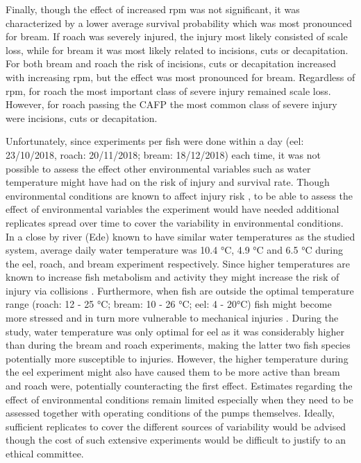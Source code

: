 \documentclass[fleqn,10pt]{wlscirep}
\begin{document}
Finally, though the effect of increased rpm was not significant, it was characterized by a lower average survival probability which was most pronounced for bream. If roach was severely injured, the injury most likely consisted of scale loss, while for bream it was most likely related to incisions, cuts or decapitation. For both bream and roach the risk of incisions, cuts or decapitation increased with increasing rpm, but the effect was most pronounced for bream. Regardless of rpm, for roach the most important class of severe injury remained scale loss. However, for roach passing the CAFP the most common class of severe injury were incisions, cuts or decapitation. 

Unfortunately, since experiments per fish were done within a day (eel: 23/10/2018, roach: 20/11/2018; bream: 18/12/2018) each time, it was not possible to assess the effect other environmental variables such as water temperature might have had on the risk of injury and survival rate. Though environmental conditions are known to affect injury risk \cite{Noble2012InjuriesWelfare,Yang2022EffectsPump}, to be able to assess the effect of environmental variables the experiment would have needed additional replicates spread over time to cover the variability in environmental conditions. In a close by river (Ede) known to have similar water temperatures as the studied system, average daily water temperature was 10.4 °C, 4.9 °C and 6.5 °C during the eel, roach, and bream experiment respectively. Since higher temperatures are known to increase fish metabolism and activity they might increase the risk of injury via collisions \cite{Noble2012InjuriesWelfare}. Furthermore, when fish are outside the optimal temperature range (roach: 12 - 25 °C; bream: 10 - 26 °C; eel: 4 - 20°C) fish might become more stressed and in turn more vulnerable to mechanical injuries \cite{Yang2022EffectsPump,Souchon2012SynthesisRivers}. During the study, water temperature was only optimal for eel as it was considerably higher than during the bream and roach experiments, making the latter two fish species potentially more susceptible to injuries. However, the higher temperature during the eel experiment might also have caused them to be more active than bream and roach were, potentially counteracting the first effect. Estimates regarding the effect of environmental conditions remain limited especially when they need to be assessed together with operating conditions of the pumps themselves. Ideally, sufficient replicates to cover the different sources of variability would be advised though the cost of such extensive experiments would be difficult to justify to an ethical committee. 
\end{document}
